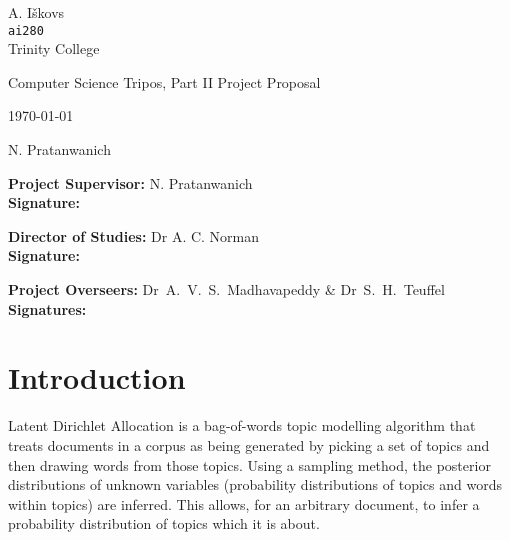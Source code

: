 \documentclass[12pt,a4]{article}
\begin{document}
\vfil


\begin{flushright}
\large{A. I\v{s}kovs}\\
\texttt{ai280}\\
Trinity College
\end{flushright}

\vspace{0.3in}
\begin{center}{\large Computer Science Tripos, Part II Project Proposal}

\vspace{0.3in}
\textbf{}

\vspace{0.4in}
\centerline{\large \today}
\end{center}

\vfil

 N. Pratanwanich
\vspace{0.4in}

\noindent
{\bf Project Supervisor:} N. Pratanwanich\\

\noindent
{\bf Signature:}
\vspace{0.2in}

\noindent
{\bf Director of Studies:} Dr A. C. Norman\\

\noindent
{\bf Signature:}
\vspace{0.2in}
 
\noindent
{\bf Project Overseers:} Dr~A.~V.~S.~Madhavapeddy  \& Dr~S.~H.~Teuffel\\

\noindent
{\bf Signatures:}

\pagebreak


\section*{Introduction}

Latent Dirichlet Allocation\cite{Blei} is a bag-of-words topic modelling algorithm that treats documents in a corpus as being generated by picking a set of topics and then drawing words from those topics. Using a sampling method, the posterior distributions of unknown variables (probability distributions of topics and words within topics) are inferred. This allows, for an arbitrary document, to infer a probability distribution of topics which it is about.
\end{document}
